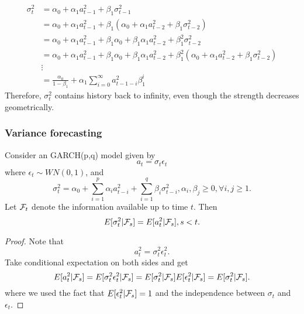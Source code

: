 \begin{note}
\begin{align*}
\sigma_t^2 &= \alpha_0 + \alpha_1 a_{t-1}^2 + \beta_1\sigma_{t-1}^2\\
&=\alpha_0 + \alpha_1 a_{t-1}^2 + \beta_1(\alpha_0 + \alpha_1 a_{t-2}^2 + \beta_1\sigma_{t-2}^2) \\
&=\alpha_0 + \alpha_1 a_{t-1}^2 + \beta_1\alpha_0 + \beta_1\alpha_1 a_{t-2}^2 + \beta_1^2\sigma_{t-2}^2\\
&=\alpha_0 + \alpha_1 a_{t-1}^2 + \beta_1\alpha_0 + \beta_1\alpha_1 a_{t-2}^2 + \beta_1^2(\alpha_0 + \alpha_1 a_{t-2}^2 + \beta_1\sigma_{t-2}^2) \\
&\vdots \\
&=\frac{\alpha_0}{1 - \beta_1} + \alpha_1\sum_{i=0}^{\infty} a_{t-1-i}^2\beta_1^i
\end{align*}
Therefore, $\sigma_t^2$ contains history back to infinity, even though the strength decreases geometrically. 
\end{note}


\subsubsection{Variance forecasting}
\begin{lemma}\label{ch:time-series-analysis:th:ConditionalExpectationEquivalenceVarianceSquareInnovationGARCH(p,q)}
	Consider an GARCH(p,q) model given by
		$$a_t = \sigma_t \epsilon_t$$
	where $\epsilon_t\sim WN(0,1)$, 
	and $$\sigma_t^2 = \alpha_0 + \sum_{i=1}^p \alpha_i a_{t-i}^2 + \sum_{i=1}^q \beta_i \sigma_{t-i}^2, \alpha_i, \beta_j \geq 0,\forall i,j \geq 1.$$	
	Let $\mathcal{F}_t$ denote the information available up to time $t$. 
	Then
	$$E[\sigma_{t}^2|\mathcal{F}_s] = E[a_{t}^2|\mathcal{F}_s],s < t.$$
\end{lemma}
\begin{proof}
	Note that $$a_t^2 = \sigma_t^2 \epsilon_t^2.$$
	Take conditional expectation on both sides and get
	$$E[a_t^2|\mathcal{F}_s] = E[\sigma_t^2 \epsilon_t^2|\mathcal{F}_s] = E[\sigma_t^2|\mathcal{F}_s] E[\epsilon_t^2|\mathcal{F}_s] = E[\sigma_t^2|\mathcal{F}_s].$$
	where we used the fact that $E[\epsilon_t^2|\mathcal{F}_s] = 1$ and the independence between $\sigma_t$ and $\epsilon_t$.	
\end{proof}

